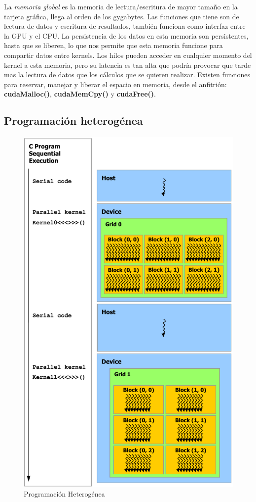 La \textit{memoria global} es la memoria de lectura/escritura de mayor tamaño en la tarjeta gráfica, llega al orden de los gygabytes. Las funciones que tiene son de lectura de datos y escritura de resultados, también funciona como interfaz entre la GPU y el CPU. La persistencia de los datos en esta memoria son persistentes, hasta que se liberen, lo que nos permite que esta memoria funcione para compartir datos entre kernels. Los hilos pueden acceder en cualquier momento del kernel a esta memoria, pero su latencia es tan alta que podría provocar que tarde mas la lectura de datos que los cálculos que se quieren realizar. Existen funciones para reservar, manejar y liberar el espacio en memoria, desde el anfitrión: \textbf{cudaMalloc()}, \textbf{cudaMemCpy()} y \textbf{cudaFree()}.



\subsection{Programación heterogénea}

\begin{figure}[h]
			\centering
				\includegraphics[scale=0.35]{img/PH.png}
			\caption{Programación Heterogénea}
\end{figure}

